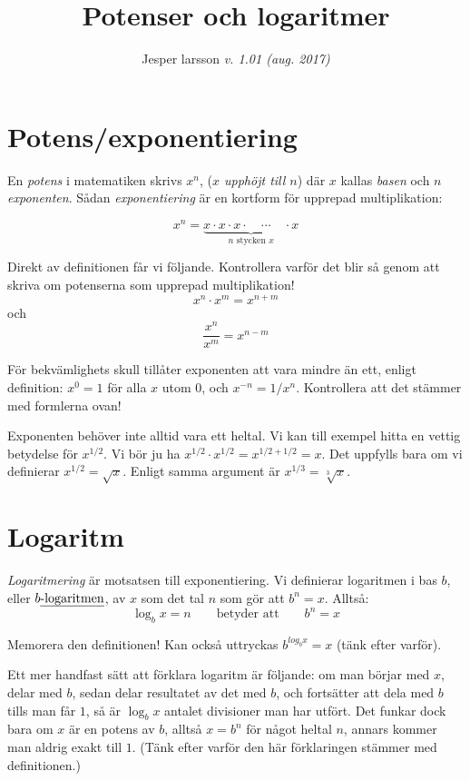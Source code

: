 \documentclass[a4paper]{article}
\author{Jesper larsson \enspace \textit{v. 1.01 (aug. 2017)}}
\date{}
\title{Potenser och logaritmer}
\begin{document}
\maketitle

\section*{Potens/exponentiering}
\label{sec:org541d7b1}

En \emph{potens} i matematiken skrivs \(x^{n}\), (\emph{\(x\) upphöjt till \(n\)}) där
\(x\) kallas \emph{basen} och \(n\) \emph{exponenten}. Sådan \emph{exponentiering} är en kortform
för upprepad multiplikation:

\[x^n = \underbrace{x \cdot x \cdot x\cdot \quad \cdots \quad \cdot x}_{n\text{ stycken }x}\]

Direkt av definitionen får vi följande. Kontrollera varför det blir så genom att skriva om potenserna som
upprepad multiplikation!
\[x^n \cdot x^m = x^{n+m}\]
och
\[\dfrac{x^n}{x^m} = x^{n-m}\]  

För bekvämlighets skull tillåter exponenten att vara mindre än ett, enligt
definition: \(x^0 = 1\) för alla \(x\) utom \(0\), och \(x^{-n} = 1 / x^n\). Kontrollera
att det stämmer med formlerna ovan!

Exponenten behöver inte alltid vara ett heltal. Vi kan till exempel hitta en
vettig betydelse för \(x^{1/2}\). Vi bör ju ha \(x^{1/2}\cdot x^{1/2} = x^{1/2 +
1/2} = x\). Det uppfylls bara om vi definierar \(x^{1/2} = \sqrt{x}\). Enligt samma
argument är \(x^{1/3} = \sqrt[3]{x}\).

\section*{Logaritm}
\label{sec:org8da2d70}

\emph{Logaritmering} är motsatsen till exponentiering. Vi definierar logaritmen i bas
\(b\), eller 
\(b\text{\emph{-logaritmen}}\), av \(x\) som det tal \(n\) som gör att \(b^{n}=x\). Alltså:
\[\log_b x = n \qquad \text{betyder att} \qquad b^n = x\]

Memorera den definitionen! Kan också uttryckas \(b^{log_b x} = x\) (tänk
efter varför).

Ett mer handfast sätt att förklara logaritm är följande: om
man börjar med \(x\), delar med \(b\), sedan delar resultatet av det med \(b\), och
fortsätter att dela med \(b\) tills man får \(1\), 
så är \(\log_b x\) antalet divisioner man har utfört. Det funkar
dock bara om \(x\) är en potens av \(b\), alltså \(x=b^n\) för något heltal \(n\), annars
kommer man aldrig exakt till \(1\).  (Tänk efter varför den här förklaringen
stämmer med definitionen.)
\end{document}
